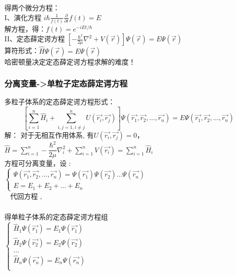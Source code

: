 \begin{frame}
	\frametitle{}
	得两个微分方程：\\  \vspace{0.3cm}
	I、演化方程  $ \displaystyle  i\hbar \frac{1}{f(t)}  \frac{\partial }{\partial t} f(t)=E $  \\ 
	解方程，得：$\displaystyle  f(t) =e^{-iEt/\hbar}$ \\  \vspace{0.3cm}
	II、定态薛定谔方程 $\displaystyle   \left [ -\frac{\hbar^2}{2\mu }\nabla ^2 + V(\vec{r}) \right ]\Psi (\vec{r}) =E \Psi (\vec{r})  $   \\ 
	算符形式：$\displaystyle   \hat{H} \Psi (\vec{r}) =E \Psi (\vec{r})  $   \\    \vspace{0.3cm}
	哈密顿量决定定态薛定谔方程求解的难度！	
\end{frame}

\begin{frame}
	\frametitle{分离变量->单粒子定态薛定谔方程}
	多粒子体系的定态薛定谔方程形式：   
	\begin{equation*}
		\left [ \sum\limits_{i=1}^{n} \hat{H}_i + \sum_{i,j=1, i\ne j}^{n}  U(\vec{r_i},\vec{r_j}) \right ]	\Psi (\vec{r_1},\vec{r_2},...,\vec{r_n})=E 	\Psi (\vec{r_1},\vec{r_2},...,\vec{r_n})
	\end{equation*}		
	\alert{解：}  	对于无相互作用体系,
	有$ U(\vec{r_i},\vec{r_j}) =0 $，\\
	 $ \hat{H}= \sum\limits_{i=1}^{n} -\dfrac{\hbar^2}{2\mu }\nabla ^2 _i + \sum\limits_{i=1}^{n} V(\vec{r_i}) =\sum\limits_{i=1}^{n} \hat{H}_i $\\   \vspace{0.3cm}
	方程可分离变量，设 : \\
	 $\displaystyle \begin{cases}
	   	\Psi (\vec{r_1},\vec{r_2},...,\vec{r_n}) = \Psi (\vec{r_1}) \Psi (\vec{r_2})...\Psi (\vec{r_n})  \\
		E= E_1+ E_2 + ... + E_n
	\end{cases}$ \\	
 	代回方程 ,
\end{frame}

\begin{frame}
	\frametitle{}
	得单粒子体系的定态薛定谔方程组\\
	$\displaystyle \begin{cases}
		\hat{H}_1\Psi (\vec{r_1})=E_1 \Psi (\vec{r_1})  \\  
		\hat{H}_2\Psi (\vec{r_2})=E_2 \Psi (\vec{r_2})  \\
		\dots\\
		\hat{H}_n\Psi (\vec{r_n})=E_n \Psi (\vec{r_n})  \\
	\end{cases}$ \\	
\end{frame}

